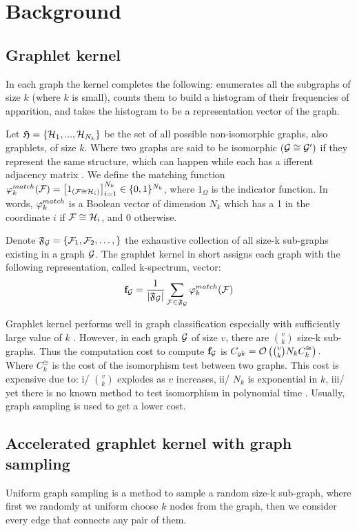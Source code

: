 \documentclass{article}
\begin{document}
\section{Background}
\label{sec:background}

\subsection{Graphlet kernel}\label{sec:graphlet_kernel}
In each graph the kernel completes the following: enumerates all the subgraphs of size $k$ (where $k$ is small), counts them to build a histogram of their frequencies of apparition, and takes the  histogram to be a representation vector of the graph. 

Let $\mathfrak{H}=\{\mathcal{H}_1,..., \mathcal{H}_{N_k}\}$ be the set of all possible non-isomorphic graphs, also graphlets, of size $k$. Where two graphs are said to be isomorphic ($\mathcal{G}\cong \mathcal{G}')$ if they represent the same structure, which can happen while each has a ifferent adjacency matrix \cite{isomorphism}. We define the matching function $\varphi_k^{match}(\mathcal{F}) = \left[ 1_{(\mathcal{F} \cong \mathcal{H}_i)}\right]_{i=1}^{N_k} \in \{0,1\}^{N_k}$, where $1_\Omega$ is the indicator function. In words, $\varphi^{match}_k$ is a Boolean vector of dimension $N_k$ which has a 1 in the coordinate $i$ if $\mathcal{F}\cong \mathcal{H}_i$, and $0$ otherwise. 

Denote $\mathfrak{F}_{\mathcal{G}}=\{\mathcal{F}_1,\mathcal{F}_2,\ldots,\}$ the exhaustive collection of all size-k sub-graphs existing in a graph $\mathcal{G}$. The graphlet kernel in short assigns each graph with the following representation, called k-spectrum, vector:
\[
\mathbf{f}_\mathcal{G}=\frac{1}{|\mathfrak{F}_\mathcal{G}|}\sum_{\mathcal{F}\in\mathfrak{F}_\mathcal{G}} \varphi^{match}_k (\mathcal{F}) 
\]

Graphlet kernel performs well in graph classification especially with sufficiently large value of $k$ \cite{graphlet_kernel}. However, in each graph $\mathcal{G}$ of size $v$, there are $\binom{v}{k}$ size-k sub-graphs. Thus the computation cost to compute $\mathbf{f}_{\mathcal{G}}$ is $ C_{gk}= \mathcal{O}\left(\tbinom{v}{k} N_k C^{\cong}_k\right).$ 
Where $C^{\cong}_k$ is the cost of the isomorphism test between two graphs. This cost is expensive due to: i/ $\binom{v}{k}$ explodes as $v$ increases, ii/ $N_k$ is exponential in $k$, iii/ yet there is no known method to test isomorphism in polynomial time \cite{isomorphism_np}. Usually, graph sampling is used to get a lower cost. 

\subsection{Accelerated graphlet kernel with graph sampling}\label{sec:accelerated_gk}
Uniform graph sampling is a method to sample a random size-k sub-graph, where first we randomly at uniform choose $k$ nodes from the graph, then we consider every edge that connects any pair of them. 
\end{document}
